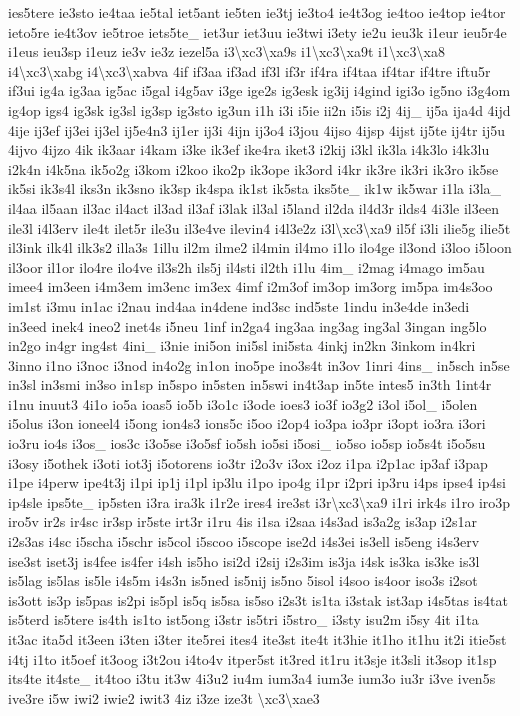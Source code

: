 \begin{DoxyCompactItemize}
ies5tere ie3sto ie4taa ie5tal iet5ant ie5ten ie3tj ie3to4 ie4t3og ie4too ie4top ie4tor ieto5re ie4t3ov ie5troe iets5te\-\_\- iet3ur iet3uu ie3twi i3ety ie2u ieu3k i1eur ieu5r4e i1eus ieu3sp i1euz ie3v ie3z iezel5a i3\textbackslash{}xc3\textbackslash{}xa9s i1\textbackslash{}xc3\textbackslash{}xa9t i1\textbackslash{}xc3\textbackslash{}xa8 i4\textbackslash{}xc3\textbackslash{}xabg i4\textbackslash{}xc3\textbackslash{}xabva 4if if3aa if3ad if3l if3r if4ra if4taa if4tar if4tre iftu5r if3ui ig4a ig3aa ig5ac i5gal i4g5av i3ge ige2s ig3esk ig3ij i4gind igi3o ig5no i3g4om ig4op igs4 ig3sk ig3sl ig3sp ig3sto ig3un i1h i3i i5ie ii2n i5is i2j 4ij\-\_\- ij5a ija4d 4ijd 4ije ij3ef ij3ei ij3el ij5e4n3 ij1er ij3i 4ijn ij3o4 i3jou 4ijso 4ijsp 4ijst ij5te ij4tr ij5u 4ijvo 4ijzo 4ik ik3aar i4kam i3ke ik3ef ike4ra iket3 i2kij i3kl ik3la i4k3lo i4k3lu i2k4n i4k5na ik5o2g i3kom i2koo iko2p ik3ope ik3ord i4kr ik3re ik3ri ik3ro ik5se ik5si ik3s4l iks3n ik3sno ik3sp ik4spa ik1st ik5sta iks5te\-\_\- ik1w ik5war i1la i3la\-\_\- il4aa il5aan il3ac il4act il3ad il3af i3lak il3al i5land il2da il4d3r ilds4 4i3le il3een ile3l i4l3erv ile4t ilet5r ile3u il3e4ve ilevin4 i4l3e2z i3l\textbackslash{}xc3\textbackslash{}xa9 il5f i3li ilie5g ilie5t il3ink ilk4l ilk3s2 illa3s 1illu il2m ilme2 il4min il4mo i1lo ilo4ge il3ond i3loo i5loon il3oor il1or ilo4re ilo4ve il3s2h ils5j il4sti il2th i1lu 4im\-\_\- i2mag i4mago im5au imee4 im3een i4m3em im3enc im3ex 4imf i2m3of im3op im3org im5pa im4s3oo im1st i3mu in1ac i2nau ind4aa in4dene ind3sc ind5ste 1indu in3e4de in3edi in3eed inek4 ineo2 inet4s i5neu 1inf in2ga4 ing3aa ing3ag ing3al 3ingan ing5lo in2go in4gr ing4st 4ini\-\_\- i3nie ini5on ini5sl ini5sta 4inkj in2kn 3inkom in4kri 3inno i1no i3noc i3nod in4o2g in1on ino5pe ino3s4t in3ov 1inri 4ins\-\_\- in5sch in5se in3sl in3smi in3so in1sp in5spo in5sten in5swi in4t3ap in5te intes5 in3th 1int4r i1nu inuut3 4i1o io5a ioas5 io5b i3o1c i3ode ioes3 io3f io3g2 i3ol i5ol\-\_\- i5olen i5olus i3on ioneel4 i5ong ion4s3 ions5c i5oo i2op4 io3pa io3pr i3opt io3ra i3ori io3ru io4s i3os\-\_\- ios3c i3o5se i3o5sf io5sh io5si i5osi\-\_\- io5so io5sp io5s4t i5o5su i3osy i5othek i3oti iot3j i5otorens io3tr i2o3v i3ox i2oz i1pa i2p1ac ip3af i3pap i1pe i4perw ipe4t3j i1pi ip1j i1pl ip3lu i1po ipo4g i1pr i2pri ip3ru i4ps ipse4 ip4si ip4sle ips5te\-\_\- ip5sten i3ra ira3k i1r2e ires4 ire3st i3r\textbackslash{}xc3\textbackslash{}xa9 i1ri irk4s i1ro iro3p iro5v ir2s ir4sc ir3sp ir5ste irt3r i1ru 4is i1sa i2saa i4s3ad is3a2g is3ap i2s1ar i2s3as i4sc i5scha i5schr is5col i5scoo i5scope ise2d i4s3ei is3ell is5eng i4s3erv ise3st iset3j is4fee is4fer i4sh is5ho isi2d i2sij i2s3im is3ja i4sk is3ka is3ke is3l is5lag is5las is5le i4s5m i4s3n is5ned is5nij is5no 5isol i4soo is4oor iso3s i2sot is3ott is3p is5pas is2pi is5pl is5q is5sa is5so i2s3t is1ta i3stak ist3ap i4s5tas is4tat is5terd is5tere is4th is1to ist5ong i3str is5tri i5stro\-\_\- i3sty isu2m i5sy 4it i1ta it3ac ita5d it3een i3ten i3ter ite5rei ites4 ite3st ite4t it3hie it1ho it1hu it2i itie5st i4tj i1to it5oef it3oog i3t2ou i4to4v itper5st it3red it1ru it3sje it3sli it3sop it1sp its4te it4ste\-\_\- it4too i3tu it3w 4i3u2 iu4m ium3a4 ium3e ium3o iu3r i3ve iven5s ive3re i5w iwi2 iwie2 iwit3 4iz i3ze ize3t \textbackslash{}xc3\textbackslash{}xae3 
\end{DoxyCompactItemize}
